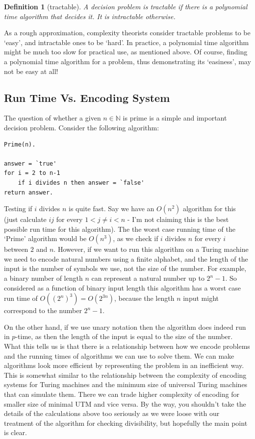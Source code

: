 \documentclass{article}
\theoremstyle{plain}
\newtheorem{definition}[theorem]{Definition}{\bfseries}{\upshape}
\theoremstyle{definition}
\begin{document}
\begin{definition}[tractable]
A decision problem is tractable if there is a polynomial time algorithm that decides it. It is \emph{intractable} otherwise. 
\end{definition}

As a rough approximation, complexity theorists consider tractable problems to be `easy', and intractable ones to be `hard'. In practice, a polynomial time algorithm might be much too slow for practical use, as mentioned above. Of course, finding a polynomial time algorithm for a problem, thus demonstrating its `easiness', may not be easy at all!


\subsection{Run Time Vs. Encoding System}
The question of whether a given $n\in\mathbb{N}$ is prime is a simple and important decision problem. Consider the following algorithm:

\begin{verbatim}
Prime(n).

answer = `true'
for i = 2 to n-1
	if i divides n then answer = `false'
return answer.	
\end{verbatim} 

Testing if $i$ divides $n$ is quite fast. Say we have an $O(n^2)$ algorithm for this (just calculate $ij$ for every $1< j\neq i < n$ - I'm not claiming this is the best possible run time for this algorithm). The the worst case running time of the `Prime' algorithm would be $O(n^3)$, as we check if $i$ divides $n$ for every $i$ between $2$ and $n$. However, if we want to run this algorithm on a Turing machine we need to encode natural numbers using a finite alphabet, and the length of the input is the number of symbols we use, not the size of the number. For example, a binary number of length $n$ can represent a natural number up to $2^n-1$. So considered as a function of binary input length this algorithm has a worst case run time of $O((2^n)^3)=O(2^{3n})$, because the length $n$ input might correspond to the number $2^n-1$.  

On the other hand, if we use unary notation then the algorithm does indeed run in $p$-time, as then the length of the input is equal to the size of the number. What this tells us is that there is a relationship between how we encode problems and the running times of algorithms we can use to solve them. We can make algorithms look more efficient by representing the problem in an inefficient way. This is somewhat similar to the relationship between the complexity of encoding systems for Turing machines and the minimum size of universal Turing machines that can simulate them. There we can trade higher complexity of encoding for smaller size of minimal UTM and vice versa. By the way, you shouldn’t take the details of the calculations above too seriously as we were loose with our treatment of the algorithm for checking divisibility, but hopefully the main point is clear.  
\end{document}
